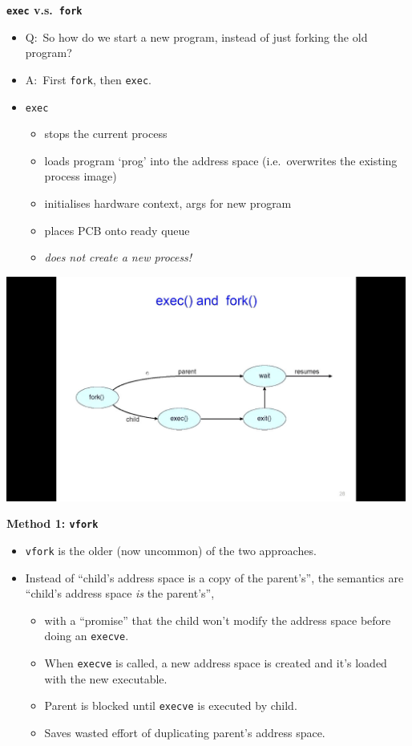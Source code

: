 \documentclass[11pt,a4paper]{article}
\begin{document}
\textbf{\texttt{exec} v.s.\ \texttt{fork}}
\begin{itemize}
    \item Q:\ So how do we start a new program, instead of just forking the old program?
    \item A:\ First \texttt{fork}, then \texttt{exec}.
    \item \texttt{exec}
        \begin{itemize}
            \item stops the current process
            \item loads program `prog' into the address space
                (i.e.\ overwrites the existing process image)
            \item initialises hardware context, args for new program
            \item places PCB onto ready queue
            \item \emph{does not create a new process!}
        \end{itemize}
\end{itemize}

\includegraphics[height=280]{exec-and-fork.jpg}

\textbf{Method 1: \texttt{vfork}}
\begin{itemize}
    \item \texttt{vfork} is the older (now uncommon) of the two approaches.
    \item Instead of ``child's address space is a copy of the parent's'',
        the semantics are ``child's address space \emph{is} the parent's'',
        \begin{itemize}
            \item with a ``promise'' that the child won't modify the address space before doing
                an \texttt{execve}.
            \item When \texttt{execve} is called, a new address space is created and it's
                loaded with the new executable.
            \item Parent is blocked until \texttt{execve} is executed by child.
            \item Saves wasted effort of duplicating parent's address space.
        \end{itemize}
\end{itemize}
\end{document}
